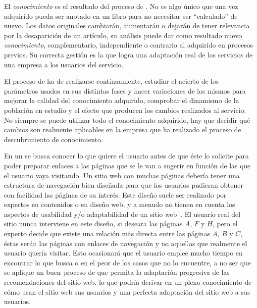 
El \textsl{conocimiento} es el resultado del proceso de \KDD. No es algo único que una vez adquirido pueda ser anotado en un libro para no necesitar ser "`calculado"' de nuevo. Los datos originales cambiarán, aumentarán o dejarán de tener relevancia por la desaparición de un artículo, su análisis puede dar como resultado nuevo \textsl{conocimiento}, complementario, independiente o contrario al adquirido en procesos previos. Su correcta gestión es la que logra una adaptación real de los servicios de una empresa a los usuarios del servicio.

El proceso de \KDD ha de realizarse continuamente, estudiar el acierto de los parámetros usados en sus distintas fases y hacer variaciones de los mismos para mejorar la calidad del conocimiento adquirido, comprobar el dinamismo de la población en estudio y el efecto que producen los cambios realizados al servicio. No siempre se puede utilizar todo el conocimiento adquirido, hay que decidir qué cambios son realmente aplicables en la empresa que ha realizado el proceso de descubrimiento de conocimiento.

En un \srw se busca conocer lo que quiere el usuario antes de que éste lo solicite para poder preparar enlaces a las páginas que se le van a sugerir en función de las que el usuario vaya visitando. Un sitio web con muchas páginas debería tener una estructura de navegación bien diseñada para que los usuarios pudieran obtener con facilidad las páginas de su interés. Este diseño suele ser realizado por expertos en contenidos o en diseño web, y a menudo no tienen en cuenta los aspectos de usabilidad y/o adaptabilidad de un sitio web~\citep{PenarrubiaFCaballeroGonzalez-PortalesWebAdaptativos-2004}. El usuario real del sitio nunca interviene en este diseño, si deseara las páginas $A$, $F$ y $H$, pero el experto decide que existe una relación más directa entre las páginas $A$, $B$ y $C$, éstas serán las páginas con enlaces de navegación y no aquellas que realmente el usuario quería visitar. Esto ocasionará que el usuario emplee mucho tiempo en encontrar lo que busca o en el peor de los casos que no lo encuentre, a no ser que se aplique un buen proceso de \wum que permita la adaptación progresiva de las recomendaciones del sitio web, lo que podría derivar en un pleno conocimiento de cómo usan el sitio web sus usuarios y una perfecta adaptación del sitio web a sus usuarios.

